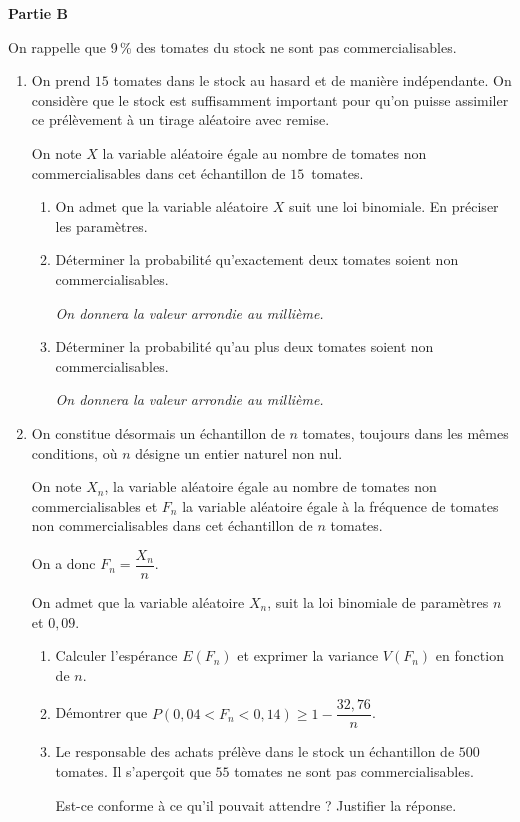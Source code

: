 \bigskip

\textbf{Partie B}

\medskip

On rappelle que 9\,\% des tomates du stock ne sont pas commercialisables.

\medskip

\begin{enumerate}
\item On prend $15$ tomates dans le stock au hasard et de manière indépendante. On considère que le stock est suffisamment important pour qu'on puisse assimiler ce prélèvement à un tirage aléatoire avec remise.

On note $X$ la variable aléatoire égale au nombre de tomates non commercialisables dans cet échantillon de $15$~tomates.
	\begin{enumerate}
		\item On admet que la variable aléatoire $X$ suit une loi binomiale. En préciser les paramètres.
		\item Déterminer la probabilité qu'exactement deux tomates soient non commercialisables.

\emph{On donnera la valeur arrondie au millième.}
		\item Déterminer la probabilité qu'au plus deux tomates soient non commercialisables.

\emph{On donnera la valeur arrondie au millième.}
	\end{enumerate}
\item On constitue désormais un échantillon de $n$ tomates, toujours dans les mêmes conditions, où $n$ désigne un entier naturel non nul.

On note $X_n$, la variable aléatoire égale au nombre de tomates non commercialisables et $F_n$ la variable aléatoire égale à la fréquence de tomates non commercialisables dans cet échantillon de $n$ tomates.

On a donc $F_n = \dfrac{X_n}{n}$.

On admet que la variable aléatoire $X_n$, suit la loi binomiale de paramètres $n$ et $0,09$.
	\begin{enumerate}
		\item Calculer l'espérance $E(F_n)$ et exprimer la variance $V(F_n)$ en fonction de $n$.
		\item Démontrer que $P(0,04 < F_n < 0,14) \geqslant 1 - \dfrac{32,76}{n}$.
		\item Le responsable des achats prélève dans le stock un échantillon de $500$ tomates. Il s'aperçoit que $55$ tomates ne sont pas commercialisables. 

Est-ce conforme à ce qu'il pouvait attendre ? Justifier la réponse.
	\end{enumerate}
\end{enumerate}

\medskip
